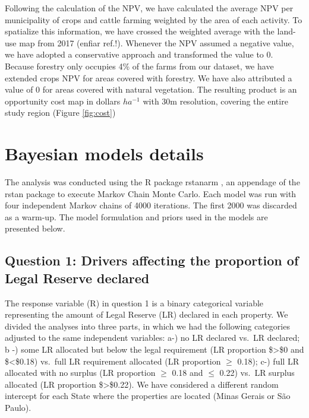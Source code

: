 \documentclass[
	12pt,				%
	oneside,			%
	a4paper,			%
	chapter=TITLE,		%
	section=TITLE,		%
	brazil,			%
	english				%
	]{abntex2}
\begin{document}
Following the calculation of the NPV, we have calculated the average NPV per municipality of crops and cattle farming weighted by the area of each activity. To spatialize this information, we have crossed the weighted average with the land-use map from 2017 (enfiar ref.!). Whenever the NPV assumed a negative value, we have adopted a conservative approach and transformed the value to 0. Because forestry only occupies 4\% of the farms from our dataset, we have extended crops NPV for areas covered with forestry. We have also attributed a value of 0 for areas covered with natural vegetation. The resulting product is an opportunity cost map in dollars \(ha^{-1}\) with 30m resolution, covering the entire study region (Figure \ref{fig:cost})

\hypertarget{bayesian-models-details}{%
\section{Bayesian models details}\label{bayesian-models-details}}

The analysis was conducted using the R package rstanarm \autocite{gabry_rstanarm_2018}, an appendage of the rstan \autocite{guo_rstan_2019} package to execute Markov Chain Monte Carlo. Each model was run with four independent Markov chains of 4000 iterations. The first 2000 was discarded as a warm-up. The model formulation and priors used in the models are presented below.

\hypertarget{question-1-drivers-affecting-the-proportion-of-legal-reserve-declared}{%
\subsection{Question 1: Drivers affecting the proportion of Legal Reserve declared}\label{question-1-drivers-affecting-the-proportion-of-legal-reserve-declared}}

The response variable (R) in question 1 is a binary categorical variable representing the amount of Legal Reserve (LR) declared in each property. We divided the analyses into three parts, in which we had the following categories adjusted to the same independent variables: a-) no LR declared vs.~LR declared; b -) some LR allocated but below the legal requirement (LR proportion \$\textgreater\$0 and \$\textless\$0.18) vs.~full LR requirement allocated (LR proportion \(\geq\) 0.18); c-) full LR allocated with no surplus (LR proportion \(\geq\) 0.18 and \(\leq\) 0.22) vs.~LR surplus allocated (LR proportion \$\textgreater\$0.22). We have considered a different random intercept for each State where the properties are located (Minas Gerais or São Paulo).
\end{document}
